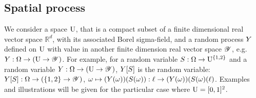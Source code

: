 \subsection{Spatial process}
We consider a space $\mathrm{U}$, that is a compact %
subset of a finite dimensional real vector space $\mathbb{R}^d$, with its associated Borel sigma-field, and a random process $Y$ defined on $\mathrm{U}$ with value in another finite dimension real vector space $\mathscr{Y}$, e.g. $Y:\Omega\to(\mathrm{U}\to\mathscr{Y})$. %
  For example, for a random variable $S:\Omega\to\mathrm{U}^{\{1,2\}}$ and a random variable
$Y:\Omega\to(\mathrm{U}\to\mathscr{Y})$, 
$Y[S]$ is the random variable: $Y[S]:\Omega\to(\{1,2\}\to\mathscr{Y})$, $\omega\mapsto(Y(\omega))(S(\omega)):\ell\to(Y(\omega))(S(\omega)(\ell)$. Examples and illustrations will be given for the particular case where $\mathrm{U}=[0,1]^2$.
